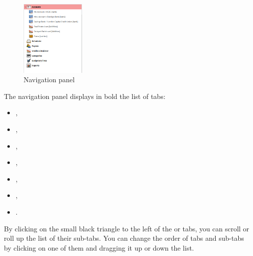 \begin{figure}%
\vspace{-\intextsep}				%
\centering							%
\includegraphics[width=0.28\textwidth]{image/screenshot/home_navigation}
\vspace{-5pt}						%
\captionsetup{%
	format=plain,					%
	name=Fig.,						%
	justification=centering,		%
	labelsep=newline				%
}
\caption{Navigation panel}		%
\vspace{-40pt}						%
\label{home_navigation}
\end{figure}

The navigation panel displays in bold the list of tabs:
	\begin{itemize}
		\item {},
		\item {},
		\item {},
		\item {},
		\item {},
		\item {},
		\item {}.
	\end{itemize}
By clicking on the small black triangle to the left of the  or  tabs,  you can scroll or roll up the list of their sub-tabs. You can change the order of tabs and sub-tabs by clicking on one of them and dragging it up or down the list.


